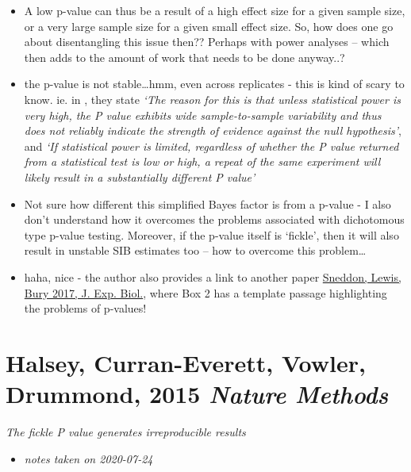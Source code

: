 \documentclass[
]{book}
\providecommand{\tightlist}{%
  \setlength{\itemsep}{0pt}\setlength{\parskip}{0pt}}
\begin{document}
\begin{itemize}
\tightlist
\item
  A low p-value can thus be a result of a high effect size for a given sample size, or a very large sample size for a given small effect size. So, how does one go about disentangling this issue then?? Perhaps with power analyses -- which then adds to the amount of work that needs to be done anyway..?
\item
  the p-value is not stable\ldots hmm, even across replicates - this is kind of scary to know. ie. in \citep{halsey2015fickle}, they state \emph{`The reason for this is that unless statistical power is very high, the P value exhibits wide sample-to-sample variability and thus does not reliably indicate the strength of evidence against the null hypothesis'}, and \emph{`If statistical power is limited, regardless of whether the P value returned from a statistical test is low or high, a repeat of the same experiment will likely result in a substantially different P value'}
\item
  Not sure how different this simplified Bayes factor is from a p-value - I also don't understand how it overcomes the problems associated with dichotomous type p-value testing. Moreover, if the p-value itself is `fickle', then it will also result in unstable SIB estimates too -- how to overcome this problem\ldots{}
\item
  haha, nice - the author also provides a link to another paper \href{https://jeb.biologists.org/content/220/17/3007}{Sneddon, Lewis, Bury 2017, J. Exp. Biol.}, where Box 2 has a template passage highlighting the problems of p-values!
\end{itemize}

\hypertarget{halsey-curran-everett-vowler-drummond-2015-nature-methods}{%
\chapter{\texorpdfstring{Halsey, Curran-Everett, Vowler, Drummond, 2015 \emph{Nature Methods}}{Halsey, Curran-Everett, Vowler, Drummond, 2015 Nature Methods}}\label{halsey-curran-everett-vowler-drummond-2015-nature-methods}}


\emph{The fickle P value generates irreproducible results} \citep{halsey2015fickle}

\begin{itemize}
\tightlist
\item
  \emph{notes taken on 2020-07-24}
\end{itemize}
\end{document}
